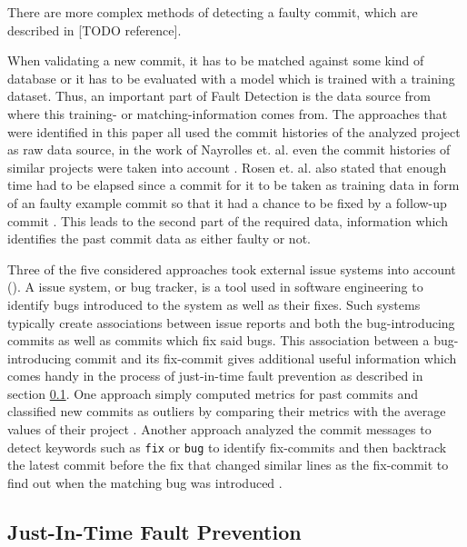 There are more complex methods of detecting a faulty commit, which are described in [TODO reference].

When validating a new commit, it has to be matched against some kind of database or it has to be evaluated with a model which is trained with a training dataset. Thus, an important part of Fault Detection is the data source from where this training- or matching-information comes from. The approaches that were identified in this paper all used the commit histories of the analyzed project as raw data source, in the work of Nayrolles et. al. even the commit histories of similar projects were taken into account \cite{Nayrolles2018}. 
Rosen et. al. also stated that enough time had to be elapsed since a commit for it to be taken as training data in form of an faulty example commit so that it had a chance to be fixed by a follow-up commit \cite{Rosen2015}.%
This leads to the second part of the required data, information which identifies the past commit data as either faulty or not. 

Three of the five considered approaches took external issue systems into account (\cite{Nayrolles2018, Yang2015, Kamei2013}). A issue system, or bug tracker, is a tool used in software engineering to identify bugs introduced to the system as well as their fixes. Such systems typically create associations between issue reports and both the bug-introducing commits as well as commits which fix said bugs. This association between a bug-introducing commit and its fix-commit gives additional useful information which comes handy in the process of just-in-time fault prevention as described in section \ref{sec:faultprevention}.
One approach simply computed metrics for past commits and classified new commits as outliers by comparing their metrics with the average values of their project \cite{Goyal2017}. Another approach analyzed the commit messages to detect keywords such as \texttt{fix} or \texttt{bug} to identify fix-commits and then backtrack the latest commit before the fix that changed similar lines as the fix-commit to find out when the matching bug was introduced \cite{Rosen2015}.

\subsection{Just-In-Time Fault Prevention}
\label{sec:faultprevention}

